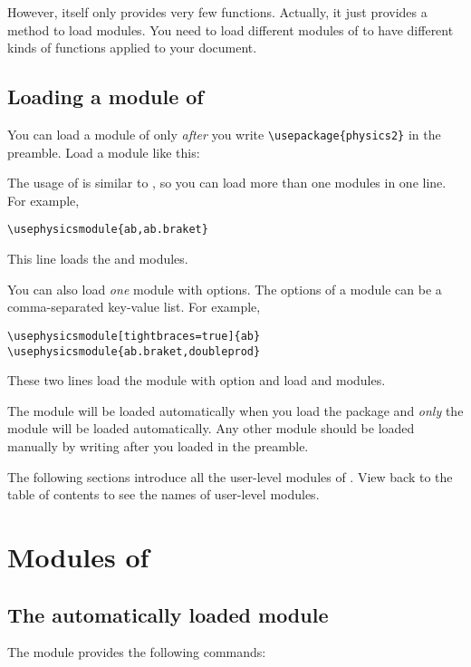 \documentclass[11pt,letterpaper]{article}
\begin{document}
However,  itself only provides very few functions. Actually, it
just provides a method to load modules. You need to load different modules of
 to have different kinds of functions applied to your document.

\subsection{Loading a module of }
You can load a module of  only \emph{after} you write
\verb|\usepackage{physics2}| in the preamble. Load a  module
like this:
\begin{center}
\end{center}
The usage of  is similar to , so you can
load more than one modules in one line. For example,
\begin{Verbatim}
\usephysicsmodule{ab,ab.braket}
\end{Verbatim}
This line loads the  and  modules.

You can also load \emph{one} module with options. The options of a
 module can be a comma-separated key-value list. For example,
\begin{Verbatim}
\usephysicsmodule[tightbraces=true]{ab}
\usephysicsmodule{ab.braket,doubleprod}
\end{Verbatim}
These two lines load the  module with option
 and load  and 
modules.

\pardanger
The  module will be loaded automatically when you load the
 package and \emph{only} the  module will be
loaded automatically. Any other module should be loaded manually by writing
 after you loaded  in the
preamble.

The following sections introduce all the user-level modules of .
View back to the table of contents to see the names of user-level modules.

\section{Modules of }
\subsection{The automatically loaded  module}
The  module provides the following commands:
\end{document}
